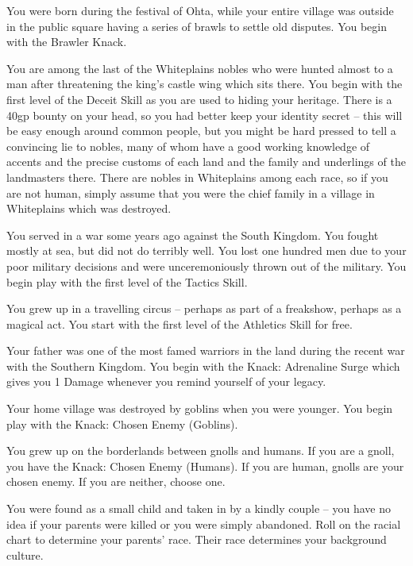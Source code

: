\begin{multicols}{2}
\begin{list}{\addtocounter{list}{1}\textbf{:}}{\raggedleft}
\item{You were born during the festival of Ohta, while your entire village was outside in the public square having a series of brawls to settle old disputes.  You begin with the Brawler Knack.}

\item{You are among the last of the Whiteplains nobles who were hunted almost to a man after threatening the king's castle wing which sits there.
You begin with the first level of the Deceit Skill as you are used to hiding your heritage.
There is a 40gp bounty on your head, so you had better keep your identity secret -- this will be easy enough around common people, but you might be hard pressed to tell a convincing lie to nobles, many of whom have a good working knowledge of accents and the precise customs of each land and the family and underlings of the landmasters there.
There are nobles in Whiteplains among each race, so if you are not human, simply assume that you were the chief family in a village in Whiteplains which was destroyed.}

\item{You served in a war some years ago against the South Kingdom.  You fought mostly at sea, but did not do terribly well.  You lost one hundred men due to your poor military decisions and were unceremoniously thrown out of the military.  You begin play with the first level of the Tactics Skill.}

\item{You grew up in a travelling circus -- perhaps as part of a freakshow, perhaps as a magical act.  You start with the first level of the Athletics Skill for free.}

\item{Your father was one of the most famed warriors in the land during the recent war with the Southern Kingdom.  You begin with the Knack: Adrenaline Surge which gives you 1 Damage whenever you remind yourself of your legacy.}

\item{Your home village was destroyed by goblins when you were younger.
You begin play with the Knack: Chosen Enemy (Goblins).}

\item{You grew up on the borderlands between gnolls and humans.  If you are a gnoll, you have the Knack: Chosen Enemy (Humans).  If you are human, gnolls are your chosen enemy.  If you are neither, choose one.}

\item{You were found as a small child and taken in by a kindly couple -- you have no idea if your parents were killed or you were simply abandoned. Roll on the racial chart to determine your parents' race.  Their race determines your background culture.}


\end{list}
\end{multicols}
